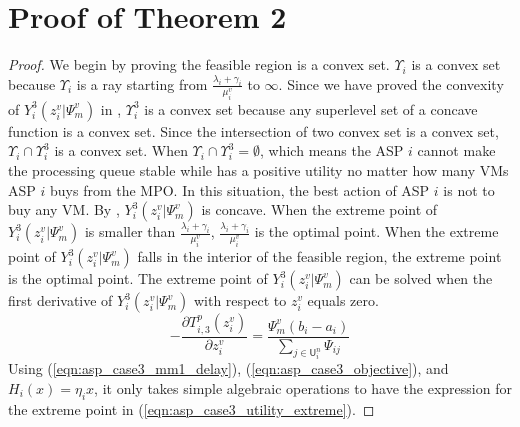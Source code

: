 \documentclass[10pt,journal, compsoc]{IEEEtran}
\begin{document}
  \section{Proof of Theorem 2}\label{appendix:theorem_2}
    \begin{proof}
    We begin by proving the feasible region is a convex set. $\Upsilon_i$ is a convex set because $\Upsilon_i$ is a ray starting from $\frac{\lambda_i+\gamma_i}{\mu_i^v}$ to $\infty$. Since we have proved the convexity of $Y_i^3(z_i^v|\Psi_m^v)$ in , $\Upsilon_i^3$ is a convex set because any superlevel set of a concave function is a convex set. Since the intersection of two convex set is a convex set, $\Upsilon_i \cap \Upsilon_i^3$ is a convex set. When $\Upsilon_i \cap \Upsilon_i^3 = \emptyset$, which means the ASP $i$ cannot make the processing queue stable while has a positive utility no matter how many VMs ASP $i$ buys from the MPO. In this situation, the best action of ASP $i$ is not to buy any VM. By , $Y_i^3(z_i^v|\Psi_m^v)$ is concave. When the extreme point of $Y_i^3(z_i^v|\Psi_m^v)$ is smaller than $\frac{\lambda_i+\gamma_i}{\mu_i^v}$, $\frac{\lambda_i+\gamma_i}{\mu_i^v}$ is the optimal point. When the extreme point of $Y_i^3(z_i^v|\Psi_m^v)$ falls in the interior of the feasible region, the extreme point is the optimal point. The extreme point of $Y_i^3(z_i^v|\Psi_m^v)$ can be solved when the first derivative of $Y_i^3(z_i^v|\Psi_m^v)$ with respect to $z_i^v$ equals zero.
    \begin{equation} \label{eqn:asp_case3_utility_first_deriv}
    -\frac{\partial T_{i,3}^p(z_i^v)}{\partial z_i^v} = \frac{\Psi_m^v (b_i - a_i)}{\sum_{j \in \mathsf{U}_i^n} \Psi_{ij}}
    \end{equation}
    Using (\ref{eqn:asp_case3_mm1_delay}), (\ref{eqn:asp_case3_objective}), and $H_i(x)=\eta_i x $, it only takes simple algebraic operations to have the expression for the extreme point in (\ref{eqn:asp_case3_utility_extreme}). \qedhere
    \end{proof}
\end{document}
